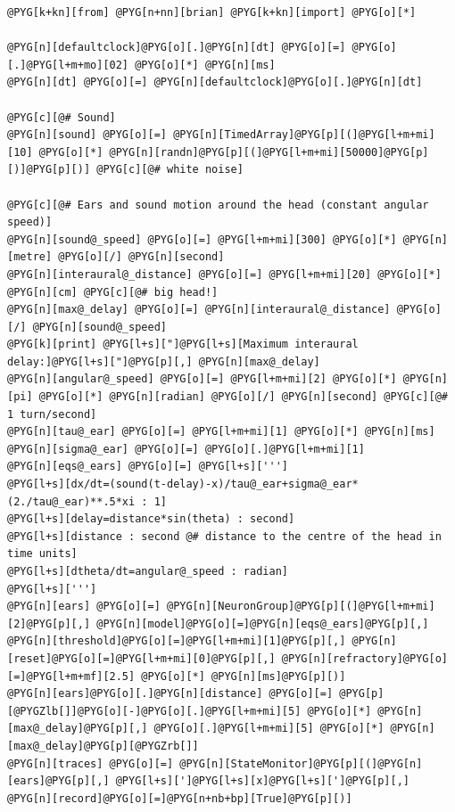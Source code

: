 \documentclass[letterpaper,10pt,english]{manual}
\begin{document}
\begin{Verbatim}[commandchars=@\[\]]
@PYG[k+kn][from] @PYG[n+nn][brian] @PYG[k+kn][import] @PYG[o][*]

@PYG[n][defaultclock]@PYG[o][.]@PYG[n][dt] @PYG[o][=] @PYG[o][.]@PYG[l+m+mo][02] @PYG[o][*] @PYG[n][ms]
@PYG[n][dt] @PYG[o][=] @PYG[n][defaultclock]@PYG[o][.]@PYG[n][dt]

@PYG[c][@# Sound]
@PYG[n][sound] @PYG[o][=] @PYG[n][TimedArray]@PYG[p][(]@PYG[l+m+mi][10] @PYG[o][*] @PYG[n][randn]@PYG[p][(]@PYG[l+m+mi][50000]@PYG[p][)]@PYG[p][)] @PYG[c][@# white noise]

@PYG[c][@# Ears and sound motion around the head (constant angular speed)]
@PYG[n][sound@_speed] @PYG[o][=] @PYG[l+m+mi][300] @PYG[o][*] @PYG[n][metre] @PYG[o][/] @PYG[n][second]
@PYG[n][interaural@_distance] @PYG[o][=] @PYG[l+m+mi][20] @PYG[o][*] @PYG[n][cm] @PYG[c][@# big head!]
@PYG[n][max@_delay] @PYG[o][=] @PYG[n][interaural@_distance] @PYG[o][/] @PYG[n][sound@_speed]
@PYG[k][print] @PYG[l+s]["]@PYG[l+s][Maximum interaural delay:]@PYG[l+s]["]@PYG[p][,] @PYG[n][max@_delay]
@PYG[n][angular@_speed] @PYG[o][=] @PYG[l+m+mi][2] @PYG[o][*] @PYG[n][pi] @PYG[o][*] @PYG[n][radian] @PYG[o][/] @PYG[n][second] @PYG[c][@# 1 turn/second]
@PYG[n][tau@_ear] @PYG[o][=] @PYG[l+m+mi][1] @PYG[o][*] @PYG[n][ms]
@PYG[n][sigma@_ear] @PYG[o][=] @PYG[o][.]@PYG[l+m+mi][1]
@PYG[n][eqs@_ears] @PYG[o][=] @PYG[l+s][''']
@PYG[l+s][dx/dt=(sound(t-delay)-x)/tau@_ear+sigma@_ear*(2./tau@_ear)**.5*xi : 1]
@PYG[l+s][delay=distance*sin(theta) : second]
@PYG[l+s][distance : second @# distance to the centre of the head in time units]
@PYG[l+s][dtheta/dt=angular@_speed : radian]
@PYG[l+s][''']
@PYG[n][ears] @PYG[o][=] @PYG[n][NeuronGroup]@PYG[p][(]@PYG[l+m+mi][2]@PYG[p][,] @PYG[n][model]@PYG[o][=]@PYG[n][eqs@_ears]@PYG[p][,] @PYG[n][threshold]@PYG[o][=]@PYG[l+m+mi][1]@PYG[p][,] @PYG[n][reset]@PYG[o][=]@PYG[l+m+mi][0]@PYG[p][,] @PYG[n][refractory]@PYG[o][=]@PYG[l+m+mf][2.5] @PYG[o][*] @PYG[n][ms]@PYG[p][)]
@PYG[n][ears]@PYG[o][.]@PYG[n][distance] @PYG[o][=] @PYG[p][@PYGZlb[]]@PYG[o][-]@PYG[o][.]@PYG[l+m+mi][5] @PYG[o][*] @PYG[n][max@_delay]@PYG[p][,] @PYG[o][.]@PYG[l+m+mi][5] @PYG[o][*] @PYG[n][max@_delay]@PYG[p][@PYGZrb[]]
@PYG[n][traces] @PYG[o][=] @PYG[n][StateMonitor]@PYG[p][(]@PYG[n][ears]@PYG[p][,] @PYG[l+s][']@PYG[l+s][x]@PYG[l+s][']@PYG[p][,] @PYG[n][record]@PYG[o][=]@PYG[n+nb+bp][True]@PYG[p][)]


\end{Verbatim}
\end{document}

